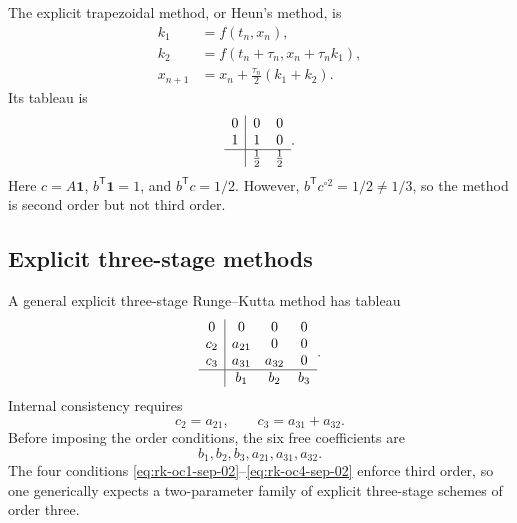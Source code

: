 \begin{example}
  The explicit trapezoidal method, or Heun's method, is
  \begin{align*}
    k_1&=f(t_n,x_n),\\
    k_2&=f(t_n+\tau_n,x_n+\tau_n k_1),\\
    x_{n+1}&=x_n+\frac{\tau_n}{2}(k_1+k_2).
  \end{align*}
  Its tableau is
  \[
    \begin{array}{c|cc}
      0&0&0\\
      1&1&0\\ \hline
       &\tfrac12&\tfrac12
    \end{array}.
  \]
  Here \(c=A\mathbf{1}\),
  \(b^{\mathsf T}\mathbf{1}=1\), and
  \(b^{\mathsf T}c=1/2\). However,
  \(b^{\mathsf T}c^{\circ2}=1/2\neq1/3\), so the method is second
  order but not third order.
\end{example}

\subsection{Explicit three-stage methods}

A general explicit three-stage Runge--Kutta method has tableau
\[
  \begin{array}{c|ccc}
    0   &0&0&0\\
    c_2 &a_{21}&0&0\\
    c_3 &a_{31}&a_{32}&0\\ \hline
        &b_1&b_2&b_3
  \end{array}.
\]
Internal consistency requires
\[
  c_2=a_{21},
  \qquad
  c_3=a_{31}+a_{32}.
\]
Before imposing the order conditions, the six free coefficients are
\[
  b_1,b_2,b_3,a_{21},a_{31},a_{32}.
\]
The four conditions
\eqref{eq:rk-oc1-sep-02}--\eqref{eq:rk-oc4-sep-02} enforce third order,
so one generically expects a two-parameter family of explicit
three-stage schemes of order three.
